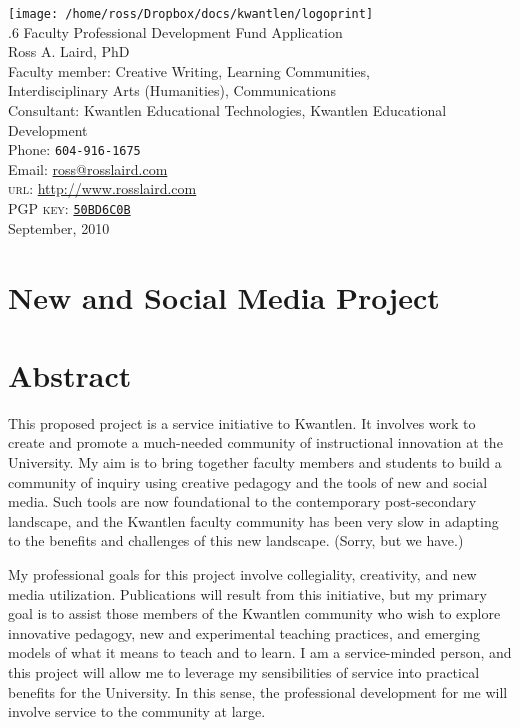 \documentclass[10pt, letterpaper]{article}
\begin{document}
\thispagestyle{empty}
\reversemarginpar
\noindent
\texttt{[image: /home/ross/Dropbox/docs/kwantlen/logoprint]}\\[2em]
{\LARGE .6 Faculty Professional Development Fund Application}\\[2em]
{\Large Ross A. Laird, PhD}\\ Faculty member: Creative Writing, Learning Communities,\\Interdisciplinary Arts (Humanities), Communications\\
Consultant: Kwantlen Educational Technologies, Kwantlen Educational Development\\
Phone: \texttt{604-916-1675}\\
Email: \href{mailto:ross@rosslaird.com}{ross@rosslaird.com}\\
\textsc{url}: \href{http://www.rosslaird.com}{http://www.rosslaird.com}\\
\textsc{PGP key}: \href{http://keyserver.ubuntu.com:11371/pks/lookup?op=get&search=0x623D9CC650BD6C0B}{\texttt{50BD6C0B}}
\\[2em]
September, 2010
\section*{New and Social Media Project}

\section*{Abstract}
\label{sec-1}

This proposed project is a service initiative to Kwantlen. It involves work to create and promote a much-needed community of instructional innovation at the University. My aim is to bring together faculty members and students to build a community of inquiry using creative pedagogy and the tools of new and social media. Such tools are now foundational to the contemporary post-secondary landscape, and the Kwantlen faculty community has been very slow in adapting to the benefits and challenges of this new landscape. (Sorry, but we have.\dag)

My professional goals for this project involve collegiality, creativity, and new media utilization. Publications will result from this initiative, but my primary goal is to assist those members of the Kwantlen community who wish to explore innovative pedagogy, new and experimental teaching practices, and emerging models of what it means to teach and to learn. I am a service-minded person, and this project will allow me to leverage my sensibilities of service into practical benefits for the University. In this sense, the professional development for me will involve service to the community at large.\\ 
\end{document}
